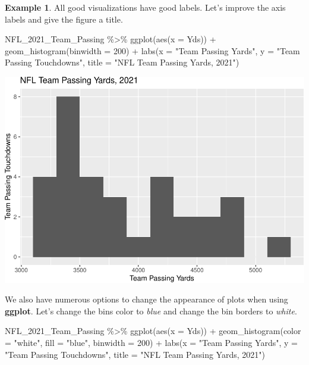 \documentclass[
  11pt,
]{book}
\newenvironment{Shaded}{\begin{snugshade}}{\end{snugshade}}
\newcommand{\AttributeTok}[1]{\textcolor[rgb]{0.77,0.63,0.00}{#1}}
\newcommand{\DecValTok}[1]{\textcolor[rgb]{0.00,0.00,0.81}{#1}}
\newcommand{\FunctionTok}[1]{\textcolor[rgb]{0.00,0.00,0.00}{#1}}
\newcommand{\NormalTok}[1]{#1}
\newcommand{\SpecialCharTok}[1]{\textcolor[rgb]{0.00,0.00,0.00}{#1}}
\newcommand{\StringTok}[1]{\textcolor[rgb]{0.31,0.60,0.02}{#1}}
\theoremstyle{definition}
\theoremstyle{definition}
\newtheorem{example}{Example}[chapter]
\theoremstyle{definition}
\theoremstyle{definition}
\theoremstyle{remark}
\begin{document}
\begin{example}
All good visualizations have good labels. Let's improve the axis labels and give the figure a title.

\begin{Shaded}
\begin{Highlighting}[]
\NormalTok{NFL\_2021\_Team\_Passing }\SpecialCharTok{\%\textgreater{}\%}
    \FunctionTok{ggplot}\NormalTok{(}\FunctionTok{aes}\NormalTok{(}\AttributeTok{x =}\NormalTok{ Yds)) }\SpecialCharTok{+} \FunctionTok{geom\_histogram}\NormalTok{(}\AttributeTok{binwidth =} \DecValTok{200}\NormalTok{) }\SpecialCharTok{+} \FunctionTok{labs}\NormalTok{(}\AttributeTok{x =} \StringTok{"Team Passing Yards"}\NormalTok{,}
    \AttributeTok{y =} \StringTok{"Team Passing Touchdowns"}\NormalTok{, }\AttributeTok{title =} \StringTok{"NFL Team Passing Yards, 2021"}\NormalTok{)}
\end{Highlighting}
\end{Shaded}

\includegraphics{series_files/figure-latex/hist2-1.pdf}

We also have numerous options to change the appearance of plots when using \textbf{ggplot}. Let's change the bins color to \emph{blue} and change the bin borders to \emph{white}.

\begin{Shaded}
\begin{Highlighting}[]
\NormalTok{NFL\_2021\_Team\_Passing }\SpecialCharTok{\%\textgreater{}\%}
    \FunctionTok{ggplot}\NormalTok{(}\FunctionTok{aes}\NormalTok{(}\AttributeTok{x =}\NormalTok{ Yds)) }\SpecialCharTok{+} \FunctionTok{geom\_histogram}\NormalTok{(}\AttributeTok{color =} \StringTok{"white"}\NormalTok{, }\AttributeTok{fill =} \StringTok{"blue"}\NormalTok{, }\AttributeTok{binwidth =} \DecValTok{200}\NormalTok{) }\SpecialCharTok{+}
    \FunctionTok{labs}\NormalTok{(}\AttributeTok{x =} \StringTok{"Team Passing Yards"}\NormalTok{, }\AttributeTok{y =} \StringTok{"Team Passing Touchdowns"}\NormalTok{, }\AttributeTok{title =} \StringTok{"NFL Team Passing Yards, 2021"}\NormalTok{)}
\end{Highlighting}
\end{Shaded}


\end{example}
\end{document}
